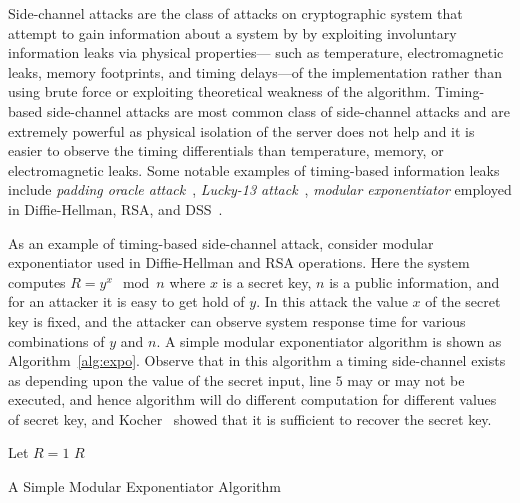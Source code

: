 Side-channel attacks are the class of attacks on cryptographic system that
attempt to gain information about a system by by exploiting involuntary
information leaks via physical properties---
such as temperature, electromagnetic leaks, memory footprints, and timing
delays---of the implementation rather than using brute force or exploiting
theoretical weakness of the algorithm.
Timing-based side-channel attacks are most common class of
side-channel attacks and are extremely powerful as physical isolation of the
server does not help and it is easier to observe the timing differentials than
temperature, memory, or electromagnetic leaks.  
Some notable examples of timing-based information leaks include \emph{padding oracle
attack}~\cite{Vau02}, \emph{Lucky-13 attack}~\cite{al2013lucky},  \emph{modular
exponentiator} employed in Diffie-Hellman, RSA, and DSS~\cite{kocher96}.

As an example of timing-based side-channel attack, consider modular
exponentiator used in Diffie-Hellman and RSA operations.
Here the system computes $R = y^x \mod n$ where $x$ is a secret key, $n$ is a
public information, and for an attacker it is easy to get hold of $y$.
In this attack the value $x$ of the secret key is fixed, and the attacker can
observe system response time for various combinations of $y$ and $n$.
A simple modular exponentiator algorithm is shown as Algorithm~\ref{alg:expo}.
Observe that in this algorithm a timing side-channel exists as depending upon
the value of the secret input, line $5$ may or may not be executed, and hence
algorithm will do different computation for different values of secret key, and
Kocher~\cite{kocher96} showed that it is sufficient to recover the secret key.
\begin{algorithm}[t]
Let $R = 1$\;
\Return $R$\;
\caption{A Simple Modular Exponentiator Algorithm}
\label{alg:expo}
\end{algorithm}


